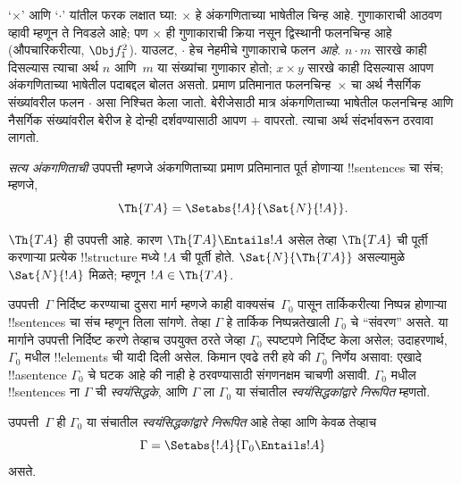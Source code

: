 \documentclass[../../../include/open-logic-section]{subfiles}
\begin{document}
`$\times$' आणि `$\cdot$' यांतील फरक लक्षात घ्या: $\times$ हे
अंकगणिताच्या भाषेतील चिन्ह आहे. गुणाकाराची आठवण व्हावी म्हणून ते
निवडले आहे; पण $\times$ ही गुणाकाराची क्रिया नसून द्विस्थानी फलनचिन्ह
आहे (औपचारिकरीत्या, $\Obj f^2_1$). याउलट, $\cdot$ हेच नेहमीचे
गुणाकाराचे फलन \emph{आहे}. $n \cdot m$ सारखे काही दिसल्यास त्याचा
अर्थ $n$ आणि~$m$ या संख्यांचा गुणाकार होतो; $x \times y$ सारखे
काही दिसल्यास आपण अंकगणिताच्या भाषेतील पदाबद्दल बोलत असतो. प्रमाण
प्रतिमानात फलनचिन्ह~$\times$ चा अर्थ नैसर्गिक संख्यांवरील फलन
$\cdot$ असा निश्चित केला जातो. बेरीजेसाठी मात्र अंकगणिताच्या
भाषेतील फलनचिन्ह आणि नैसर्गिक संख्यांवरील बेरीज हे दोन्ही दर्शवण्यासाठी
आपण $+$ वापरतो. त्याचा अर्थ संदर्भावरून ठरवावा लागतो.

\begin{defn}
\emph{सत्य अंकगणिताची} उपपत्ती म्हणजे अंकगणिताच्या प्रमाण प्रतिमानात
पूर्त होणाऱ्या !!{sentence}s चा संच; म्हणजे,
\[
\Th{TA} = \Setabs{!A}{\Sat{N}{!A}}.
\]
\end{defn}

$\Th{TA}$ ही उपपत्ती आहे. कारण $\Th{TA} \Entails !A$ असेल तेव्हा
$\Th{TA}$ ची पूर्ती करणाऱ्या प्रत्येक !!{structure} मध्ये $!A$ ची
पूर्ती होते. $\Sat{N}{\Th{TA}}$ असल्यामुळे $\Sat{N}{!A}$ मिळते;
म्हणून $!A \in \Th{TA}$.

उपपत्ती~$\Gamma$ निर्दिष्ट करण्याचा दुसरा मार्ग म्हणजे काही
वाक्यसंच~$\Gamma_0$ पासून तार्किकरीत्या निष्पन्न होणाऱ्या
!!{sentence}s चा संच म्हणून तिला सांगणे. तेव्हा $\Gamma$ हे
तार्किक निष्पन्नतेखाली $\Gamma_0$ चे ``संवरण'' असते. या मार्गाने उपपत्ती निर्दिष्ट करणे तेव्हाच
उपयुक्त ठरते जेव्हा $\Gamma_0$ स्पष्टपणे निर्दिष्ट केला असेल;
उदाहरणार्थ, $\Gamma_0$ मधील !!{element}s ची यादी दिली असेल.
किमान एवढे तरी हवे की $\Gamma_0$ निर्णेय असावा: एखादे
!!a{sentence} $\Gamma_0$ चे घटक आहे की नाही हे ठरवण्यासाठी
संगणनक्षम चाचणी असावी. $\Gamma_0$ मधील !!{sentence}s ना
$\Gamma$ ची \emph{स्वयंसिद्धके}, आणि $\Gamma$ ला
$\Gamma_0$ या संचातील \emph{स्वयंसिद्धकांद्वारे निरूपित} म्हणतो.

\begin{defn}
उपपत्ती~$\Gamma$ ही $\Gamma_0$ या संचातील
\emph{स्वयंसिद्धकांद्वारे निरूपित} आहे तेव्हा आणि केवळ तेव्हाच
\[
\Gamma = \Setabs{!A}{\Gamma_0 \Entails !A}
\]
असते.
\end{defn}
\end{document}
